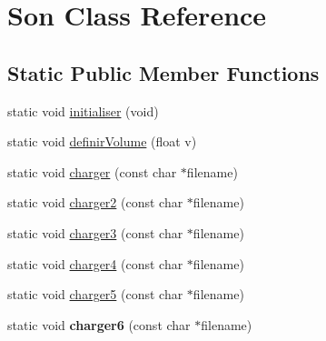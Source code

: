 \hypertarget{class_son}{}\section{Son Class Reference}
\label{class_son}
\subsection*{Static Public Member Functions}
\begin{DoxyCompactItemize}
\item 
static void \hyperlink{class_son_a34674f9bdeb2f46913a989fb649c4b4e}{initialiser} (void)
\item 
static void \hyperlink{class_son_af2d3a2f54acc7e7ebf84825afca37d5d}{definir\+Volume} (float v)
\item 
static void \hyperlink{class_son_a24b2fe04739c6ab510f37e1ab5247930}{charger} (const char $\ast$filename)
\item 
static void \hyperlink{class_son_aa38fa443675dae3008421f9a5db0ff7e}{charger2} (const char $\ast$filename)
\item 
static void \hyperlink{class_son_a99e03f65a4802d9b5ef0e15fd77021a5}{charger3} (const char $\ast$filename)
\item 
static void \hyperlink{class_son_a79ced14e9ac0305ed58eb30728d3a056}{charger4} (const char $\ast$filename)
\item 
static void \hyperlink{class_son_aba9ce95760bc4437f22ad14eb8c331cf}{charger5} (const char $\ast$filename)
\item 
static void {\bfseries charger6} (const char $\ast$filename)\hypertarget{class_son_a816f33d653cf307e46aa13b883a9fbb1}{}\label{class_son_a816f33d653cf307e46aa13b883a9fbb1}


\end{DoxyCompactItemize}
